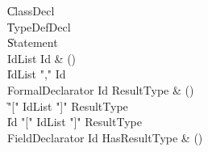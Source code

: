 \begin{bbgrammar}
    \| ClassDecl\\
    \| TypeDefDecl\\
    \| Statement\\
 IdList  \label{prod:IdList}  \: Id & ()\\
    \| IdList \xcd"," Id\\
 FormalDeclarator  \label{prod:FormalDeclarator}  \: Id ResultType & ()\\
    \| \xcd"[" IdList \xcd"]" ResultType\\
    \| Id \xcd"[" IdList \xcd"]" ResultType\\
 FieldDeclarator  \label{prod:FieldDeclarator}  \: Id HasResultType & ()\\
\end{bbgrammar}

